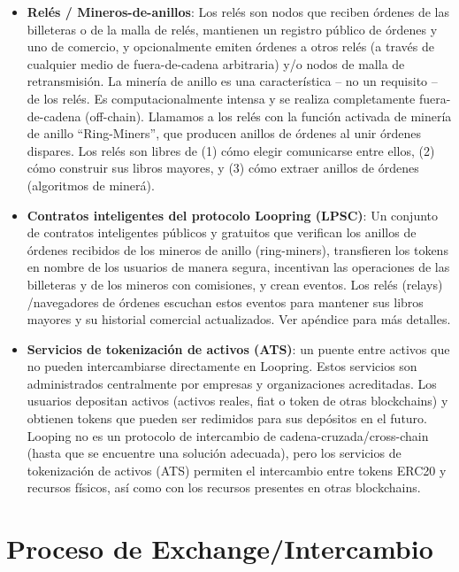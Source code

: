 \documentclass[UTF8,nofonts]{article}
\begin{document}
\begin{multicols}{2}
\begin{itemize}
\item \textbf{Rel\'es / Mineros-de-anillos}: Los rel\'es son nodos que reciben \'ordenes de las billeteras o de la malla de rel\'es, mantienen un registro p\'ublico de \'ordenes y uno de comercio, y opcionalmente emiten \'ordenes a otros rel\'es (a trav\'es de cualquier medio de fuera-de-cadena arbitraria) y/o nodos de malla de retransmisi\'on. La miner\'ia de anillo es una caracter\'istica -- no un requisito -- de los rel\'es. Es computacionalmente intensa y se realiza completamente fuera-de-cadena (off-chain). Llamamos a los rel\'es con la funci\'on activada de miner\'ia de anillo \enquote{Ring-Miners}, que producen anillos de \'ordenes al unir \'ordenes dispares. Los rel\'es son libres de (1) c\'omo elegir comunicarse entre ellos, (2) c\'omo construir sus libros mayores, y (3) c\'omo extraer anillos de \'ordenes (algoritmos de miner\'a).

\item \textbf{Contratos inteligentes del protocolo Loopring (LPSC)}: Un conjunto de contratos inteligentes p\'ublicos y gratuitos que verifican los anillos de \'ordenes recibidos de los mineros de anillo (ring-miners), transfieren los tokens en nombre de los usuarios de manera segura, incentivan las operaciones de las billeteras y de los mineros con comisiones, y crean eventos. Los rel\'es (relays) /navegadores de \'ordenes escuchan estos eventos para mantener sus libros mayores y su historial comercial actualizados. Ver ap\'endice para m\'as detalles. %

\item \textbf{Servicios de tokenizaci\'on de activos (ATS)}: un puente entre activos que no pueden intercambiarse directamente en Loopring. Estos servicios son administrados centralmente por empresas y organizaciones acreditadas. Los usuarios depositan activos (activos reales, fiat o token de otras blockchains) y obtienen tokens que pueden ser redimidos para sus dep\'ositos en el futuro. Looping no es un protocolo de intercambio de cadena-cruzada/cross-chain (hasta que se encuentre una soluci\'on adecuada), pero los servicios de tokenizaci\'on de activos (ATS) permiten el intercambio entre tokens ERC20 \cite{ERC20} y recursos f\'isicos, as\'i como con los recursos presentes en otras blockchains.

\end{itemize}



\section{Proceso de Exchange/Intercambio\label{sec:process}}
\begin{enumerate} 


\end{enumerate}
\end{multicols}
\end{document}
